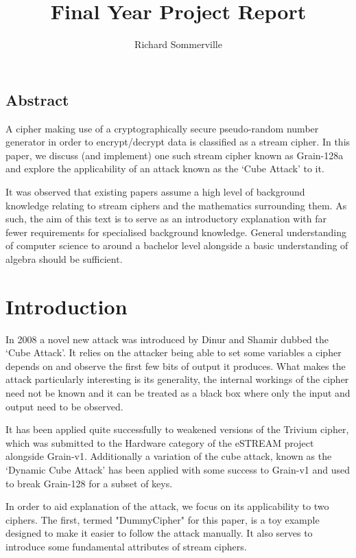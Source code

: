 \documentclass{report}
\title{Final Year Project Report}
\author{Richard Sommerville}
\date{}
\let\Oldsection\section
\renewcommand{\section}{\FloatBarrier\Oldsection}
\begin{document}
\maketitle
\tableofcontents
\section{Abstract}
A cipher making use of a cryptographically secure pseudo-random number generator in order to encrypt/decrypt data is classified as a stream cipher. In this paper, we discuss (and implement) one such stream cipher known as Grain-128a and explore the applicability of an attack known as the `Cube Attack' to it.

It was observed that existing papers assume a high level of background knowledge relating to stream ciphers and the mathematics surrounding them. As such, the aim of this text is to serve as an introductory explanation with far fewer requirements for specialised background knowledge. General understanding of computer science to around a bachelor level alongside a basic understanding of algebra should be sufficient.
\chapter{Introduction}
In 2008 a novel new attack was introduced by Dinur and Shamir\cite{DinurShamir2009} dubbed the `Cube Attack'. It relies on the attacker being able to set some variables a cipher depends on and observe the first few bits of output it produces. What makes the attack particularly interesting is its generality, the internal workings of the cipher need not be known and it can be treated as a black box where only the input and output need to be observed.

It has been applied quite successfully to weakened versions of the Trivium cipher\cite{DinurShamir2009}\cite{MobiusTransform}, which was submitted to the Hardware category of the eSTREAM project alongside Grain-v1\cite{eStreamPort}. Additionally a variation of the cube attack, known as the `Dynamic Cube Attack' has been applied with some success to Grain-v1\cite{cryptoeprint:2010:570} and used to break Grain-128\cite{DynamicCube128} for a subset of keys.

In order to aid explanation of the attack, we focus on its applicability to two ciphers. The first, termed "DummyCipher" for this paper, is a toy example designed to make it easier to follow the attack manually. It also serves to introduce some fundamental attributes of stream ciphers.
\end{document}
